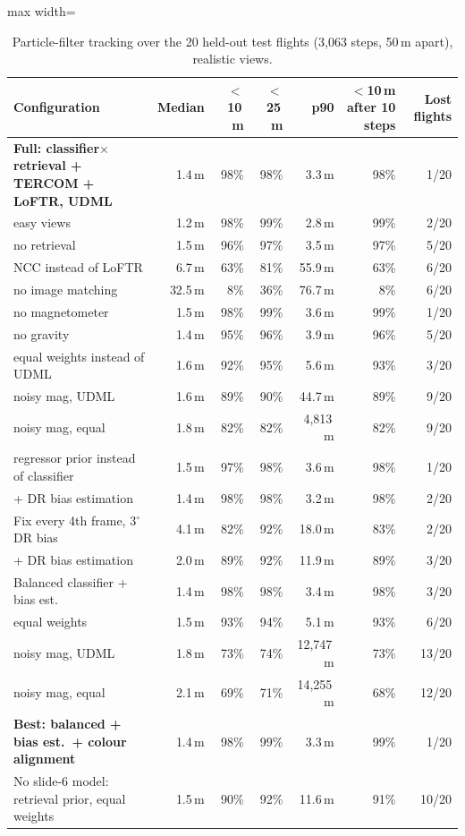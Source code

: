 \begin{table}[t]
\centering
\small
\caption{Particle-filter tracking over the 20 held-out test flights (3{,}063 steps, 50\,m apart), realistic views.}
\label{tab:track}
\begin{adjustbox}{max width=\linewidth}
\begin{tabular}{lrrrrrr}
\toprule
Configuration & Median & $<$10\,m & $<$25\,m & p90 & $<$10\,m after 10 steps & Lost flights \\
\midrule
\textbf{Full: classifier$\times$retrieval + TERCOM + LoFTR, UDML} & 1.4\,m & 98\% & 98\% & 3.3\,m & 98\% & 1/20 \\
\quad easy views & 1.2\,m & 98\% & 99\% & 2.8\,m & 99\% & 2/20 \\
\quad no retrieval & 1.5\,m & 96\% & 97\% & 3.5\,m & 97\% & 5/20 \\
\quad NCC instead of LoFTR & 6.7\,m & 63\% & 81\% & 55.9\,m & 63\% & 6/20 \\
\quad no image matching & 32.5\,m & 8\% & 36\% & 76.7\,m & 8\% & 6/20 \\
\quad no magnetometer & 1.5\,m & 98\% & 99\% & 3.6\,m & 99\% & 1/20 \\
\quad no gravity & 1.4\,m & 95\% & 96\% & 3.9\,m & 96\% & 5/20 \\
\quad equal weights instead of UDML & 1.6\,m & 92\% & 95\% & 5.6\,m & 93\% & 3/20 \\
\quad noisy mag, UDML & 1.6\,m & 89\% & 90\% & 44.7\,m & 89\% & 9/20 \\
\quad noisy mag, equal & 1.8\,m & 82\% & 82\% & 4{,}813\,m & 82\% & 9/20 \\
\quad regressor prior instead of classifier & 1.5\,m & 97\% & 98\% & 3.6\,m & 98\% & 1/20 \\
+ DR bias estimation & 1.4\,m & 98\% & 98\% & 3.2\,m & 98\% & 2/20 \\
Fix every 4th frame, 3$^\circ$ DR bias & 4.1\,m & 82\% & 92\% & 18.0\,m & 83\% & 2/20 \\
\quad + DR bias estimation & 2.0\,m & 89\% & 92\% & 11.9\,m & 89\% & 3/20 \\
Balanced classifier + bias est. & 1.4\,m & 98\% & 98\% & 3.4\,m & 98\% & 3/20 \\
\quad equal weights & 1.5\,m & 93\% & 94\% & 5.1\,m & 93\% & 6/20 \\
\quad noisy mag, UDML & 1.8\,m & 73\% & 74\% & 12{,}747\,m & 73\% & 13/20 \\
\quad noisy mag, equal & 2.1\,m & 69\% & 71\% & 14{,}255\,m & 68\% & 12/20 \\
\textbf{Best: balanced + bias est.\ + colour alignment} & 1.4\,m & 98\% & 99\% & 3.3\,m & 99\% & 1/20 \\
No slide-6 model: retrieval prior, equal weights & 1.5\,m & 90\% & 92\% & 11.6\,m & 91\% & 10/20 \\
\bottomrule
\end{tabular}
\end{adjustbox}
\end{table}
